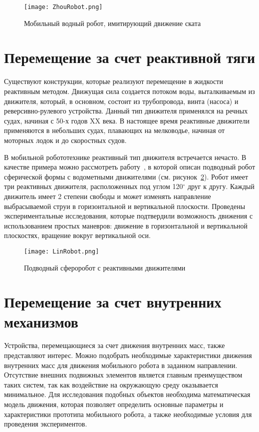 \begin{figure}[h]
	\centering
	\texttt{[image: ZhouRobot.png]}%
	\caption{Мобильный водный робот, имитирующий движение ската}
	\label{ZhouRobot}
\end{figure}

\section{Перемещение за счет реактивной тяги}\label{sec:ch1/sec4}

Существуют конструкции, которые реализуют перемещение в жидкости реактивным методом. Движущая сила создается потоком воды, выталкиваемым из движителя, который, в основном, состоит из трубопровода, винта (насоса) и реверсивно-рулевого устройства. Данный тип движителя применялся на речных судах, начиная с 50-х годов XX века. В настоящее время реактивные движители применяются в небольших судах, плавающих на мелководье, начиная от моторных лодок и до скоростных судов.

В мобильной робототехнике реактивный тип движителя встречается нечасто. В качестве примера можно рассмотреть работу~\cite{Lin_2011}, в которой описан подводный робот сферической формы с водометными движителями (см. рисунок~\ref{LinRobot}). Робот имеет три реактивных движителя, расположенных под углом 120$ ^\circ $ друг к другу. Каждый движитель имеет 2 степени свободы и может изменять направление выбрасываемой струи в горизонтальной и вертикальной плоскости. Проведены экспериментальные исследования, которые подтвердили возможность движения с использованием простых маневров: движение в горизонтальной и вертикальной плоскостях, вращение вокруг вертикальной оси.

\begin{figure}[h]
	\centering
	\texttt{[image: LinRobot.png]}%
	\caption{Подводный сфероробот с реактивными движителями}
	\label{LinRobot}
\end{figure}

\section{Перемещение за счет внутренних механизмов}\label{sec:ch1/sec5}

Устройства, перемещающиеся за счет движения внутренних масс, также представляют интерес. Можно подобрать необходимые характеристики движения внутренних масс для движения мобильного робота в заданном направлении. Отсутствие внешних подвижных элементов является главным преимуществом таких систем, так как воздействие на окружающую среду оказывается минимальное. Для исследования подобных объектов необходима математическая модель движения, которая позволяет определить основные параметры и характеристики прототипа мобильного робота, а также необходимые условия для проведения экспериментов.

